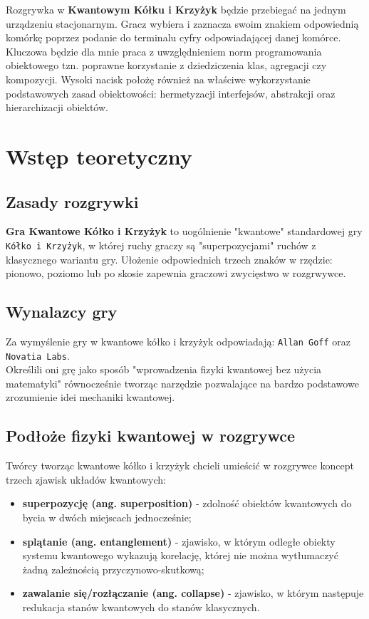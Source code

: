 \documentclass{article}
\begin{document}
Rozgrywka w \textbf{Kwantowym Kółku i Krzyżyk} będzie przebiegać na jednym urządzeniu stacjonarnym. Gracz wybiera i zaznacza swoim znakiem odpowiednią komórkę poprzez podanie do terminalu cyfry odpowiadającej danej komórce.\\

Kluczowa będzie dla mnie praca z uwzględnieniem norm programowania obiektowego tzn. poprawne korzystanie z dziedziczenia klas, agregacji czy kompozycji. Wysoki nacisk położę również na właściwe wykorzystanie podstawowych zasad obiektowości: hermetyzacji interfejsów, abstrakcji oraz hierarchizacji obiektów. 

\newpage
\section{Wstęp teoretyczny}

\subsection{Zasady rozgrywki}
\textbf{Gra Kwantowe Kółko i Krzyżyk} to uogólnienie "kwantowe" standardowej gry \texttt{Kółko i Krzyżyk}, w której ruchy graczy są "superpozycjami" ruchów z klasycznego wariantu gry. Ułożenie odpowiednich trzech znaków w rzędzie: pionowo, poziomo lub po skosie zapewnia graczowi zwycięstwo w rozgrwywce.

\subsection{Wynalazcy gry}
Za wymyślenie gry w kwantowe kółko i krzyżyk odpowiadają: \texttt{Allan Goff} oraz \texttt{Novatia Labs}.\\
Określili oni grę jako sposób "wprowadzenia fizyki kwantowej bez użycia matematyki" równocześnie tworząc narzędzie pozwalające na bardzo podstawowe zrozumienie idei mechaniki kwantowej.

\subsection{Podłoże fizyki kwantowej w rozgrywce}
Twórcy tworząc kwantowe kółko i krzyżyk chcieli umieścić w rozgrywce koncept trzech zjawisk układów kwantowych:
\begin{itemize}
    \item \textbf{superpozycję (ang. superposition)} - zdolność obiektów kwantowych do bycia w dwóch miejscach jednocześnie;
    \item \textbf{splątanie (ang. entanglement)} - zjawisko, w którym odległe obiekty systemu kwantowego wykazują korelację, której nie można wytłumaczyć żadną zależnością przyczynowo-skutkową;
    \item \textbf{zawalanie się/rozłączanie (ang. collapse)} - zjawisko, w którym następuje redukacja stanów kwantowych do stanów klasycznych.
\end{itemize}
\end{document}
